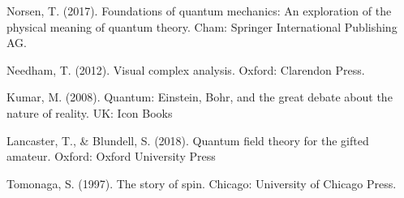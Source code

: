 \documentclass[a4paper,12pt]{book}
\begin{document}
\begin{thebibliography}{9}
 Norsen, T. (2017). Foundations of quantum mechanics: An exploration of the physical meaning of quantum theory. Cham: Springer International Publishing AG.
     
 Needham, T. (2012). Visual complex analysis. Oxford: Clarendon Press.
     
 Kumar, M. (2008). Quantum: Einstein, Bohr, and the great debate about the nature of reality. UK: Icon Books

 Lancaster, T., \& Blundell, S. (2018). Quantum field theory for the gifted amateur. Oxford: Oxford University Press

 Tomonaga, S. (1997). The story of spin. Chicago: University of Chicago Press.
\end{thebibliography}
\end{document}
